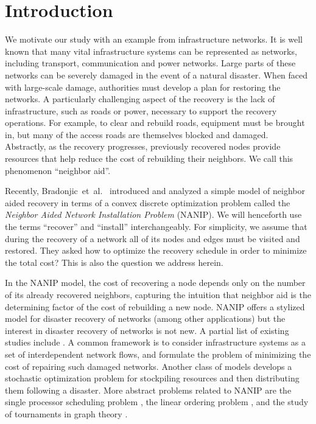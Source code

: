 \documentclass[english]{llncs}
\makeatletter
\def\blfootnote{\xdef\@thefnmark{}\@footnotetext}
\makeatother
\begin{document}
\section{Introduction}
\setcounter{footnote}{3} 

We motivate our study with an example from infrastructure networks.  It is
well known that many vital infrastructure systems can be represented as
networks, including transport, communication and power networks.  Large parts
of these networks can be severely damaged in the event of a natural disaster.
When faced with large-scale damage, authorities must develop a plan for
restoring the networks. A particularly challenging aspect of the recovery is
the lack of infrastructure, such as roads or power, necessary to support the
recovery operations.  For example, to clear and rebuild roads, equipment must
be brought in, but many of the access roads are themselves blocked and damaged.
Abstractly, as the recovery progresses, previously recovered nodes provide
resources that help reduce the cost of rebuilding their neighbors. We call this
phenomenon ``neighbor aid''.

Recently, Bradonjic~et~al.~\cite{Gutfraind14} introduced and analyzed a simple
model of neighbor aided recovery in terms of a convex discrete optimization
problem called the \emph{Neighbor Aided Network Installation Problem} (NANIP).
We will henceforth use the terms ``recover'' and ``install'' interchangeably.
For simplicity, we assume that during the recovery of a network all of its
nodes and edges must be visited and restored. They asked how to optimize the
recovery schedule in order to minimize the total cost?  This is also the
question we address herein.

In the NANIP model, the cost of recovering a node depends only on the number of
its already recovered neighbors, capturing the intuition that neighbor aid is
the determining factor of the cost of rebuilding a new node.  NANIP offers a
stylized model for disaster recovery of networks (among other applications) but
the interest in disaster recovery of networks is not new.  A partial list of
existing studies include
\cite{Guha99,nurre2010restoring,Lee07,Adibi94,Bertoli02,coffrin2011strategic}.
A common framework is to consider infrastructure systems as a set of
interdependent network flows, and formulate the problem of minimizing the cost
of repairing such damaged networks.  Another class of models
\cite{Hentenryck10} develops a stochastic optimization problem for stockpiling
resources and then distributing them following a disaster.  More abstract
problems related to NANIP are the single processor scheduling problem
\cite{Karp61}, the linear ordering problem \cite{Mitchell96}, and the study of
tournaments in graph theory \cite{West01}.  
\end{document}
